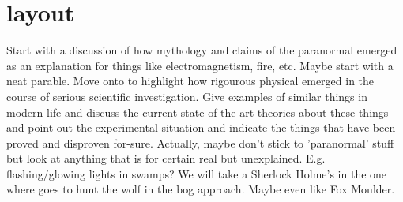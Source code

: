 \documentclass[prb,aps,11pt,superscriptaddress,floatfix]{revtex4-2}
\begin{document}
\section{layout}
Start with a discussion of how mythology and claims of the paranormal emerged as an explanation for things like electromagnetism, fire, etc. Maybe start with a neat parable. Move onto to highlight how rigourous physical emerged in the course of serious scientific investigation. Give examples of similar things in modern life and discuss the current state of the art theories about these things and point out the experimental situation and indicate the things that have been proved and disproven for-sure. Actually, maybe don't stick to 'paranormal' stuff but look at anything that is for certain real but unexplained. E.g. flashing/glowing lights in swamps? We will take a Sherlock Holme's in the one where goes to hunt the wolf in the bog approach. Maybe even like Fox Moulder. 





\end{document}
